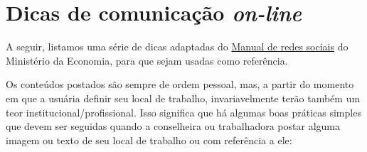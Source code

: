 \section{Dicas de comunicação \emph{on-line}}

A seguir, listamos uma série de dicas adaptadas do
\href{https://www.gov.br/economia/pt-br/centrais-de-conteudo/publicacoes/guias-e-manuais/ManualdeRedesSociais.pdf}{Manual
	de redes sociais} do Ministério da Economia, para que sejam usadas como
referência.

Os conteúdos postados são sempre de ordem pessoal, mas, a partir do
momento em que a usuária definir seu local de trabalho, invariavelmente
terão também um teor institucional/profissional. Isso significa que há
algumas boas práticas simples que devem ser seguidas quando a
conselheira ou trabalhadora postar alguma imagem ou texto de seu local
de trabalho ou com referência a ele:

